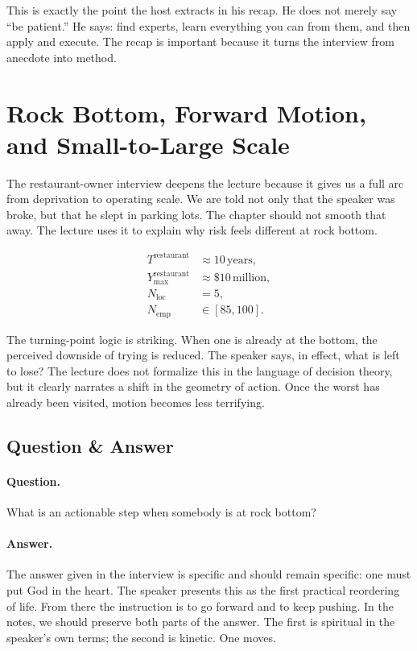 This is exactly the point the host extracts in his recap. He does not merely say ``be patient.'' He says: find experts, learn everything you can from them, and then apply and execute. The recap is important because it turns the interview from anecdote into method.

\section{Rock Bottom, Forward Motion, and Small-to-Large Scale}

The restaurant-owner interview deepens the lecture because it gives us a full arc from deprivation to operating scale. We are told not only that the speaker was broke, but that he slept in parking lots. The chapter should not smooth that away. The lecture uses it to explain why risk feels different at rock bottom.

\begin{align}
T^{\mathrm{restaurant}} &\approx 10\,\text{years},\\
Y_{\max}^{\mathrm{restaurant}} &\approx \$10\,\text{million},\\
N_{\mathrm{loc}} &= 5,\\
N_{\mathrm{emp}} &\in [85,100].
\end{align}

The turning-point logic is striking. When one is already at the bottom, the perceived downside of trying is reduced. The speaker says, in effect, what is left to lose? The lecture does not formalize this in the language of decision theory, but it clearly narrates a shift in the geometry of action. Once the worst has already been visited, motion becomes less terrifying.

\subsection{Question \& Answer}

\paragraph{Question.}
What is an actionable step when somebody is at rock bottom?

\paragraph{Answer.}
The answer given in the interview is specific and should remain specific: one must put God in the heart. The speaker presents this as the first practical reordering of life. From there the instruction is to go forward and to keep pushing. In the notes, we should preserve both parts of the answer. The first is spiritual in the speaker's own terms; the second is kinetic. One moves.

